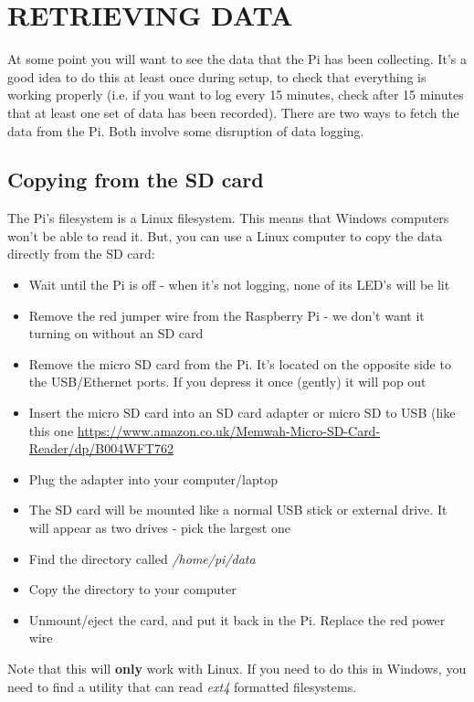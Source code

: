 \documentclass[10pt]{article}
\begin{document}
\section{RETRIEVING DATA}

At some point you will want to see the data that the Pi has been collecting. It's a good idea to do this at least once during setup, to check that everything is working properly (i.e. if you want to log every 15 minutes, check after 15 minutes that at least one set of data has been recorded). There are two ways to fetch the data from the Pi. Both involve some disruption of data logging.

\subsection{Copying from the SD card}

The Pi's filesystem is a Linux filesystem. This means that Windows computers won't be able to read it. But, you can use a Linux computer to copy the data directly from the SD card:

\begin{itemize}
 \item Wait until the Pi is off - when it's not logging, none of its LED's will be lit 
 \item Remove the red jumper wire from the Raspberry Pi - we don't want it turning on without an SD card
 \item Remove the micro SD card from the Pi. It's located on the opposite side to the USB/Ethernet ports. If you depress it once (gently) it will pop out
 \item Insert the micro SD card into an SD card adapter or micro SD to USB (like this one \url{https://www.amazon.co.uk/Memwah-Micro-SD-Card-Reader/dp/B004WFT762}
 \item Plug the adapter into your computer/laptop
 \item The SD card will be mounted like a normal USB stick or external drive. It will appear as two drives - pick the largest one
 \item Find the directory called \textit{/home/pi/data}
 \item Copy the directory to your computer
 \item Unmount/eject the card, and put it back in the Pi. Replace the red power wire
\end{itemize}

Note that this will \textbf{only} work with Linux. If you need to do this in Windows, you need to find a utility that can read \textit{ext4} formatted filesystems.
\end{document}
